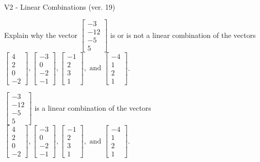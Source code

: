 \begin{exercise}
  \begin{exerciseTitle}V2 - Linear Combinations (ver. 19)\end{exerciseTitle}
  \begin{exerciseStatement}
    Explain why the vector \(\left[\begin{array}{c}
-3 \\
-12 \\
-5 \\
5
\end{array}\right]\)  is or is not a linear 
	combination of the vectors \(\left[\begin{array}{c}
4 \\
2 \\
0 \\
-2
\end{array}\right] , \left[\begin{array}{c}
-3 \\
0 \\
-2 \\
-1
\end{array}\right] , \left[\begin{array}{c}
-1 \\
2 \\
3 \\
1
\end{array}\right] , \text{ and } \left[\begin{array}{c}
-4 \\
1 \\
2 \\
1
\end{array}\right]\).
	


  \end{exerciseStatement}
  \begin{exerciseAnswer}
   \(\left[\begin{array}{c}
-3 \\
-12 \\
-5 \\
5
\end{array}\right]\) 
  	 is  
	a linear combination of the vectors \(\left[\begin{array}{c}
4 \\
2 \\
0 \\
-2
\end{array}\right] , \left[\begin{array}{c}
-3 \\
0 \\
-2 \\
-1
\end{array}\right] , \left[\begin{array}{c}
-1 \\
2 \\
3 \\
1
\end{array}\right] , \text{ and } \left[\begin{array}{c}
-4 \\
1 \\
2 \\
1
\end{array}\right]\).


\end{exerciseAnswer}
\end{exercise}

